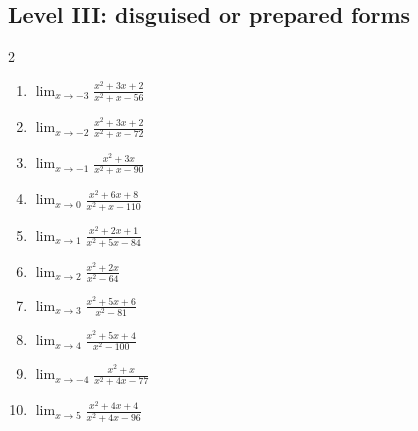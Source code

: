 \documentclass[11pt,oneside]{book}
\begin{document}
\subsection*{Level III: disguised or prepared forms}
\begin{multicols}{2}
\begin{enumerate}[leftmargin=*,label=\textbf{\arabic*.},itemsep=0.65\baselineskip]
\item $\displaystyle \lim_{x \to -3} \frac{x^{2} + 3 x + 2}{x^{2} + x - 56}$
\item $\displaystyle \lim_{x \to -2} \frac{x^{2} + 3 x + 2}{x^{2} + x - 72}$
\item $\displaystyle \lim_{x \to -1} \frac{x^{2} + 3 x}{x^{2} + x - 90}$
\item $\displaystyle \lim_{x \to 0} \frac{x^{2} + 6 x + 8}{x^{2} + x - 110}$
\item $\displaystyle \lim_{x \to 1} \frac{x^{2} + 2 x + 1}{x^{2} + 5 x - 84}$
\item $\displaystyle \lim_{x \to 2} \frac{x^{2} + 2 x}{x^{2} - 64}$
\item $\displaystyle \lim_{x \to 3} \frac{x^{2} + 5 x + 6}{x^{2} - 81}$
\item $\displaystyle \lim_{x \to 4} \frac{x^{2} + 5 x + 4}{x^{2} - 100}$
\item $\displaystyle \lim_{x \to -4} \frac{x^{2} + x}{x^{2} + 4 x - 77}$
\item $\displaystyle \lim_{x \to 5} \frac{x^{2} + 4 x + 4}{x^{2} + 4 x - 96}$
\end{enumerate}
\end{multicols}
\end{document}
